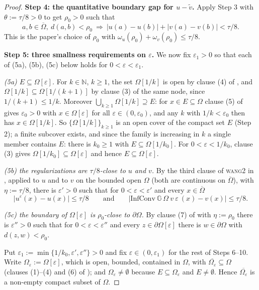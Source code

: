 \begin{proof}
\medskip\noindent\textbf{Step 4: the quantitative boundary gap for $u-\tilde v$.} Apply
Step 3 with $\theta:=\tau/8>0$ to get $\rho_0>0$ such that
\[
 a,b\in\overline\Omega,\ d(a,b)<\rho_0\ \Longrightarrow\ |u(a)-u(b)|+|v(a)-v(b)|<\tau/8. \tag{4a}
\]
This is the paper's choice of $\rho_0$ with $\omega_u(\rho_0)+\omega_v(\rho_0)\le\tau/8$.

\medskip\noindent\textbf{Step 5: three smallness requirements on $\varepsilon$.} We now fix
$\varepsilon_1>0$ so that each of (5a), (5b), (5c) below holds for
$0<\varepsilon<\varepsilon_1$.

\emph{(5a) $E\subseteq\Omega[\varepsilon]$.} For $k\in\mathbb N$, $k\ge1$, the set
$\Omega[1/k]$ is open by clause (4) of , and
$\Omega[1/k]\subseteq\Omega[1/(k+1)]$ by clause (3) of the same node, since
$1/(k+1)\le1/k$. Moreover $\bigcup_{k\ge1}\Omega[1/k]\supseteq E$: for $x\in E\subseteq\Omega$
clause (5) of  gives $\varepsilon_0>0$ with
$x\in\Omega[\varepsilon]$ for all $\varepsilon\in(0,\varepsilon_0)$, and any $k$ with
$1/k<\varepsilon_0$ then has $x\in\Omega[1/k]$. So $\{\Omega[1/k]\}_{k\ge1}$ is an open cover
of the compact set $E$ (Step 2); a finite subcover exists, and since the family is increasing
in $k$ a single member contains $E$: there is $k_0\ge1$ with $E\subseteq\Omega[1/k_0]$. For
$0<\varepsilon<1/k_0$, clause (3) gives $\Omega[1/k_0]\subseteq\Omega[\varepsilon]$ and hence
$E\subseteq\Omega[\varepsilon]$.

\emph{(5b) the regularizations are $\tau/8$-close to $u$ and $v$.} By the third clause of
\textsc{wang2} in , applied to $u$ and to $v$ on the bounded open
$\Omega$ (both are continuous on $\overline\Omega$), with $\eta:=\tau/8$, there is
$\varepsilon'>0$ such that for $0<\varepsilon<\varepsilon'$ and every $x\in\overline\Omega$
\[
 \big|u^{\varepsilon}(x)-u(x)\big|\le\tau/8
 \qquad\text{and}\qquad
 \big|\mathrm{InfConv}\ \mathbb G\ \Omega\ v\ \varepsilon\ (x)-v(x)\big|\le\tau/8. \tag{5b}
\]

\emph{(5c) the boundary of $\Omega[\varepsilon]$ is $\rho_0$-close to $\partial\Omega$.} By
clause (7) of  with $\eta:=\rho_0$ there is
$\varepsilon''>0$ such that for $0<\varepsilon<\varepsilon''$ and every
$z\in\partial\Omega[\varepsilon]$ there is $w\in\partial\Omega$ with $d(z,w)<\rho_0$.

Put $\varepsilon_1:=\min\{1/k_0,\varepsilon',\varepsilon''\}>0$ and fix
$\varepsilon\in(0,\varepsilon_1)$ for the rest of Steps 6--10. Write
$\Omega_\varepsilon:=\Omega[\varepsilon]$, which is open, bounded, contained in $\Omega$,
with $\overline{\Omega_\varepsilon}\subseteq\Omega$ (clauses (1)--(4) and (6) of
); and $\Omega_\varepsilon\neq\emptyset$ because
$E\subseteq\Omega_\varepsilon$ and $E\neq\emptyset$. Hence
$\overline{\Omega_\varepsilon}$ is a non-empty compact subset of $\Omega$.


\end{proof}
